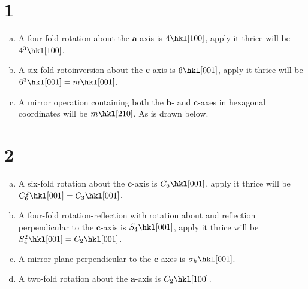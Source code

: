 \documentclass[openany]{homework}
\begin{document}
\maketitle

\section*{1}
\begin{enumerate}[a.]
        \item A four-fold rotation about the $\bm{a}$-axis is $4 \hkl[1 0 0]$, apply it thrice will be $4^3 \hkl[1 0 0]$.
        \item A six-fold rotoinversion about the $\bm{c}$-axis is $\bar{6} \hkl[0 0 1]$, apply it thrice will be $\bar{6}^3 \hkl[0 0 1] = m \hkl[0 0 1]$.
        \item A mirror operation containing both the $\bm{b}$- and $\bm{c}$-axes in hexagonal coordinates will be
              $m \hkl[2 1 0]$. As is drawn below.
\end{enumerate}

\newpage

\section*{2}
\begin{enumerate}[a.]
        \item A six-fold rotation about the $\bm{c}$-axis is $C_6 \hkl[0 0 1]$, apply it thrice will be $C_6^2 \hkl[0 0 1] = C_3 \hkl[0 0 1]$.
        \item A four-fold rotation-reflection with rotation about and reflection perpendicular to
              the $\bm{c}$-axis is $S_4 \hkl[0 0 1]$, apply it thrice will be $S_4^2 \hkl[0 0 1] = C_2 \hkl[0 0 1]$.
        \item A mirror plane perpendicular to the $\bm{c}$-axes is $\sigma_h \hkl[0 0 1]$.
        \item A two-fold rotation about the $\bm{a}$-axis is $C_2 \hkl[1 0 0]$.
\end{enumerate}
\end{document}
